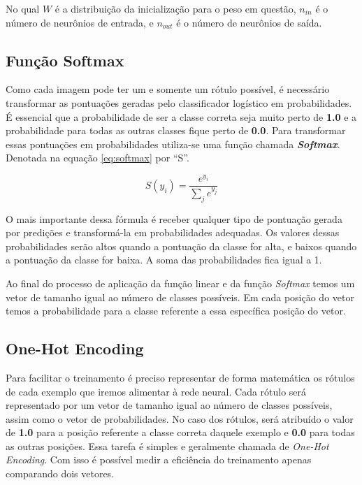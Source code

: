 No qual $W$ é a distribuição da inicialização para o peso em questão,
$n_{in}$ é o número de neurônios de entrada, e $n_{out}$ é o número de
neurônios de saída.

\subsection{Função Softmax}

Como cada imagem pode ter um e somente um rótulo possível, é necessário
transformar as pontuações geradas pelo classificador logístico em
probabilidades. É essencial que a probabilidade de ser a classe
correta seja muito perto de {\bf 1.0} e a probabilidade para todas as
outras classes fique perto de {\bf 0.0}. Para transformar essas
pontuações em probabilidades utiliza-se uma função chamada {\bf
  \emph{Softmax}}\cite{Goodfellow-et-al-2016-Book}. Denotada na
equação \ref{eq:softmax} por ``S''.

\begin{equation} \label{eq:softmax}
   S(y_i) = \displaystyle\frac{e^{y_i}}{\displaystyle\sum_{j} e^{y_j}}
\end{equation}

O mais importante dessa fórmula é receber qualquer tipo de
pontuação gerada por predições e transformá-la em probabilidades
adequadas. Os valores dessas probabilidades serão altos quando a
pontuação da classe for alta, e baixos quando a pontuação da classe for
baixa. A soma das probabilidades fica igual a 1.

Ao final do processo de aplicação da função linear e da função
\textit{Softmax} temos um vetor de tamanho igual ao número de classes
possíveis. Em cada posição do vetor temos a probabilidade para a
classe referente a essa específica posição do vetor.

\subsection{One-Hot Encoding}

Para facilitar o treinamento é preciso representar de forma matemática
os rótulos de cada exemplo que iremos alimentar à rede neural. Cada
rótulo será representado por um vetor de tamanho igual ao número de
classes possíveis, assim como o vetor de probabilidades. No caso dos
rótulos, será atribuído o valor de {\bf 1.0} para a posição referente
a classe correta daquele exemplo e {\bf 0.0} para todas as outras
posições. Essa tarefa é simples e geralmente chamada de
\textit{One-Hot Encoding}. Com isso é possível medir a eficiência do
treinamento apenas comparando dois vetores.

